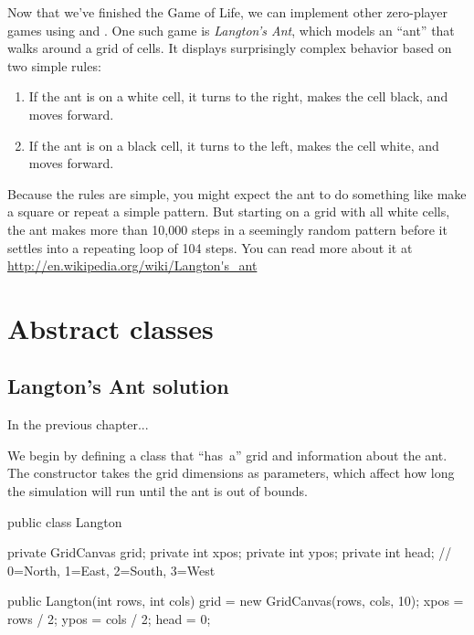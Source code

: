 \begin{exercise}

Now that we've finished the Game of Life, we can implement other zero-player games using  and .
One such game is {\it Langton's Ant}, which models an ``ant'' that walks around a grid of cells.
It displays surprisingly complex behavior based on two simple rules:

\begin{enumerate}
\item If the ant is on a white cell, it turns to the right, makes the cell black, and moves forward.
\item If the ant is on a black cell, it turns to the left, makes the cell white, and moves forward.
\end{enumerate}

Because the rules are simple, you might expect the ant to do something like make a square or repeat a simple pattern.
But starting on a grid with all white cells, the ant makes more than 10,000 steps in a seemingly random pattern before it settles into a repeating loop of 104 steps.
You can read more about it at \url{http://en.wikipedia.org/wiki/Langton's_ant}

\end{exercise}



\chapter{Abstract classes}

\section{Langton's Ant solution}

In the previous chapter...

We begin by defining a  class that ``has~a'' grid and information about the ant.
The constructor takes the grid dimensions as parameters, which affect how long the simulation will run until the ant is out of bounds.

\begin{code}
public class Langton {
    private GridCanvas grid;
    private int xpos;
    private int ypos;
    private int head; // 0=North, 1=East, 2=South, 3=West

    public Langton(int rows, int cols) {
        grid = new GridCanvas(rows, cols, 10);
        xpos = rows / 2;
        ypos = cols / 2;
        head = 0;
    }
}
\end{code}

